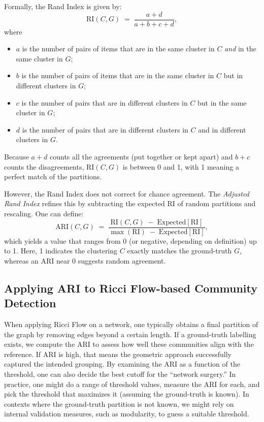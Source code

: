 Formally, the Rand Index is given by:
\begin{equation}
\mathrm{RI}(C,G) \;=\; \frac{a + d}{a + b + c + d},
\end{equation}
where 
\begin{itemize}
    \item $a$ is the number of pairs of items that are in the same cluster in $C$ \emph{and} in the same cluster in $G$;
    \item $b$ is the number of pairs of items that are in the same cluster in $C$ but in different clusters in $G$;
    \item $c$ is the number of pairs that are in different clusters in $C$ but in the same cluster in $G$;
    \item $d$ is the number of pairs that are in different clusters in $C$ and in different clusters in $G$.
\end{itemize}
Because $a+d$ counts all the agreements (put together or kept apart) and $b+c$ counts the disagreements, $\mathrm{RI}(C,G)$ is between 0 and 1, with 1 meaning a perfect match of the partitions.

However, the Rand Index does not correct for chance agreement. The \emph{Adjusted Rand Index} refines this by subtracting the expected RI of random partitions and rescaling. One can define:
\begin{equation}
\mathrm{ARI}(C,G) \;=\; \frac{\mathrm{RI}(C,G)\;-\;\mathrm{Expected}[\mathrm{RI}]}{\max(\mathrm{RI})\;-\;\mathrm{Expected}[\mathrm{RI}]},
\end{equation}
which yields a value that ranges from 0 (or negative, depending on definition) up to 1. Here, 1 indicates the clustering $C$ exactly matches the ground-truth $G$, whereas an ARI near 0 suggests random agreement.

\subsection{Applying ARI to Ricci Flow-based Community Detection}
When applying Ricci Flow on a network, one typically obtains a final partition of the graph by removing edges beyond a certain length. If a ground-truth labelling exists, we compute the ARI to assess how well these communities align with the reference. If $\mathrm{ARI}$ is high, that means the geometric approach successfully captured the intended grouping. By examining the ARI as a function of the threshold, one can also decide the best cutoff for the “network surgery.” In practice, one might do a range of threshold values, measure the ARI for each, and pick the threshold that maximizes it (assuming the ground-truth is known). In contexts where the ground-truth partition is not known, we might rely on internal validation measures, such as modularity, to guess a suitable threshold.

